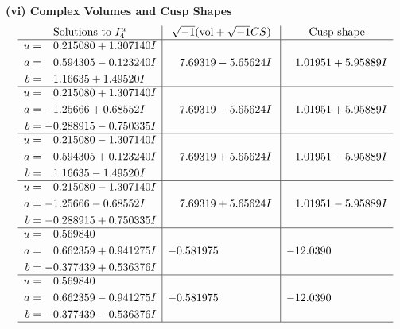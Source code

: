 \documentclass[1p]{elsarticle_modified}
\theoremstyle{definition}
\newcommand{\I}{\sqrt{-1}}
\begin{document}
\newpage\flushleft \textbf{(vi) Complex Volumes and Cusp Shapes}
$$\begin{array}{c|c|c}  
\text{Solutions to }I^u_{4}& \I (\text{vol} + \sqrt{-1}CS) & \text{Cusp shape}\\
 \hline 
\begin{aligned}
u &= \phantom{-}0.215080 + 1.307140 I \\
a &= \phantom{-}0.594305 - 0.123240 I \\
b &= \phantom{-}1.16635 + 1.49520 I\end{aligned}
 & \phantom{-}7.69319 - 5.65624 I & \phantom{-}1.01951 + 5.95889 I \\ \hline\begin{aligned}
u &= \phantom{-}0.215080 + 1.307140 I \\
a &= -1.25666 + 0.68552 I \\
b &= -0.288915 - 0.750335 I\end{aligned}
 & \phantom{-}7.69319 - 5.65624 I & \phantom{-}1.01951 + 5.95889 I \\ \hline\begin{aligned}
u &= \phantom{-}0.215080 - 1.307140 I \\
a &= \phantom{-}0.594305 + 0.123240 I \\
b &= \phantom{-}1.16635 - 1.49520 I\end{aligned}
 & \phantom{-}7.69319 + 5.65624 I & \phantom{-}1.01951 - 5.95889 I \\ \hline\begin{aligned}
u &= \phantom{-}0.215080 - 1.307140 I \\
a &= -1.25666 - 0.68552 I \\
b &= -0.288915 + 0.750335 I\end{aligned}
 & \phantom{-}7.69319 + 5.65624 I & \phantom{-}1.01951 - 5.95889 I \\ \hline\begin{aligned}
u &= \phantom{-}0.569840\phantom{ +0.000000I} \\
a &= \phantom{-}0.662359 + 0.941275 I \\
b &= -0.377439 + 0.536376 I\end{aligned}
 & -0.581975\phantom{ +0.000000I} & -12.0390\phantom{ +0.000000I} \\ \hline\begin{aligned}
u &= \phantom{-}0.569840\phantom{ +0.000000I} \\
a &= \phantom{-}0.662359 - 0.941275 I \\
b &= -0.377439 - 0.536376 I\end{aligned}
 & -0.581975\phantom{ +0.000000I} & -12.0390\phantom{ +0.000000I}\\
 \hline 
 \end{array}$$\newpage\newpage\renewcommand{\arraystretch}{1}
\end{document}
